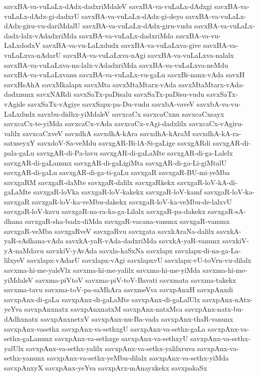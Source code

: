 {savxBA-va-vuLaLx-dAdx-dadxriMdaleV
savxBA-va-vuLaLx-dAdxgi
savxBA-va-vuLaLx-dAdx-gi-dadxrU
savxBA-va-vuLaLx-dAdx-gi-deyo
savxBA-va-vuLaLx-dAdx-giru-vu-dariMdalU
savxBA-va-vuLaLx-dAdx-giru-vudu
savxBA-va-vuLaLx-dadx-lalx-vAdadxriMda
savxBA-va-vuLaLx-dadxriMda
savxBA-va-vu-LaLxdodxV
savxBA-va-vu-LaLxdudx
savxBA-va-vuLaLxva-give
savxBA-va-vuLaLxva-nAdarU
savxBA-va-vuLaLxva-nAgi
savxBA-va-vuLaLxva-nalalx
savxBA-va-vuLaLxva-na-lalx-vAdadxriMda
savxBA-va-vuLaLxva-neMdu
savxBA-va-vuLaLxvanu
savxBA-va-vuLaLx-vu-gaLu
savxBi-nanx-vAda
savxH
savxHsAhA
savxMkalapx
savxMta
savxMtaMtarx-vAda
savxMtaMtarx-vAda-dadxnunx
savxNARdi
savxSaTx-paDisalu
savxSaTx-paDisu-vudu
savxSaTx-vAgide
savxSaTx-vAgiye
savxSapx-pa-Du-vudu
savxbA-vaveV
savxbA-va-vu-LaLxdudx
savxbu-didhx-yiMdaleV
savxcaCx
savxcaCxnu
savxcaCxsayx
savxcaCx-te-yiMda
savxcaCx-vAda
savxcaCx-vAgi-dadxlilx
savxcaCx-vAgiru-valilx
savxcaCxveV
savxdhA
savxdhA-kAra
savxdhA-kAraM
savxdhA-kA-ra-satxseyxY
savxdoV-Sa-veMdu
savxgAR-Bi-lA-Si-gaLige
savxgARdi
savxgAR-di-pala-gaLu
savxgAR-di-Pa-lavu
savxgAR-di-gaLaMte
savxgAR-di-ga-Lalelx
savxgAR-di-gaLanunx
savxgAR-di-gaLigiMta
savxgAR-di-ga-Li-giMtalU
savxgAR-di-gaLu
savxgAR-di-ga-ti-gaLu
savxgaR
savxgaR-BU-mi-yeMba
savxgaRM
savxgaR-daMte
savxgaR-dalilx
savxgaRkekx
savxgaR-loV-kA-di-gaLaMte
savxgaR-loVka
savxgaR-loV-kakekx
savxgaR-loV-kamf
savxgaR-loV-ka-savxgaR
savxgaR-loV-ka-veMbu-dakekx
savxgaR-loV-ka-veMbu-de-lalxvU
savxgaR-loV-kavu
savxgaR-na-ra-ka-ga-Lilalx
savxgaR-pa-dakekx
savxgaR-sA-dhana
savxgaR-sha-badx-diMda
savxgaR-vacana-vanunx
savxgaR-vanunx
savxgaR-veMba
savxgaRveV
savxgaRvu
savxgata
savxkAraNa-dalilx
savxkA-yaR-sAdhana-vAda
savxkA-yaR-vAda-dadxriMda
savxkA-yaR-vanunx
savxkiV-yA-naMdavu
savxkiV-yAvAda
savxla-kaSxNa
savxlapx
savxlapx-di-na-ga-La-lilxyeV
savxlapx-vAdarU
savxlapx-vAgi
savxlapxvU
savxlapx-vU-toVru-vu-dilalx
savxma-hi-me-yaleVlx
savxma-hi-me-yalilx
savxma-hi-me-yiMda
savxma-hi-me-yiMdaleV
savxma-piVtoV
savxma-piV-toV-Bavati
savxmata
savxma-takekx
savxma-tavu
savxma-toV-pa-saMhAra
savxmeVva
savxpAnxH
savxpAnxdi
savxpAnx-di-gaLa
savxpAnx-di-gaLaMte
savxpAnx-di-gaLalUlx
savxpAnx-nAtx-yeYva
savxpAnxnatx
savxpAnxnatxM
savxpAnx-natxMca
savxpAnx-natx-bu-dAdhxnatx
savxpAnxnetxV
savxpAnx-nu-Ba-vada
savxpAnx-thaR-vanunx
savxpAnx-vasethx
savxpAnx-va-sethxgU
savxpAnx-va-sethx-gaLa
savxpAnx-va-sethx-gaLanunx
savxpAnx-va-sethxge
savxpAnx-va-sethxyU
savxpAnx-va-sethx-yalUlx
savxpAnx-va-sethx-yalilx
savxpAnx-va-sethx-yalilxruva
savxpAnx-va-sethx-yanunx
savxpAnx-va-sethx-yeMbu-dilalx
savxpAnx-va-sethx-yiMda
savxpAnxyX
savxpAnx-yeYva
savxpArx-mAnayxkekx
savxpakaSx
}
